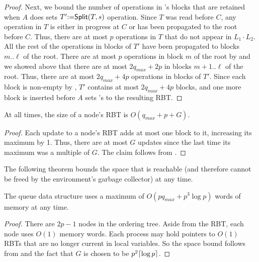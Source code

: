 \begin{proof}
Next, we bound the number of operations in 's blocks that are retained when $A$ does sets
$T'\mbox{:=}{\sf Split}(T,s)$ operation.
Since $T$ was read before $C$, any operation in $T$ is either in progress at $C$ or has been propagated to the root before $C$.
Thus, there are at most $p$ operations in $T$ that do not appear in $L_1\cdot L_2$.
All the rest of the operations in blocks of $T'$ have been propagated to blocks $m..\ell$ of the root.
There are at most $p$ operations in block $m$ of the root by 
and we showed above that there are at most $2q_{max} + 2p$ in blocks 
$m+1..\ell$ of the root.
Thus, there are at most $2q_{max}+4p$ operations in blocks of $T'$.
Since each block is non-empty by , $T'$ contains at most $2q_{max}+4p$ blocks, and one more 
block is inserted before $A$ sets 's  to the resulting RBT.
\end{proof}


\begin{corollary}\label{RBTbound}
At all times, the size of a node's RBT is $O(q_{max}+p+G)$. 
\end{corollary}
\begin{proof}
Each update to a node's RBT adds at most one block to it, increasing its maximum  by 1.
Thus, there are at most $G$ updates since the last time its maximum  was a multiple of $G$.
The claim follows from .
\end{proof}

The following theorem bounds the space that is reachable (and therefore cannot be freed by the environment's garbage collector) at any time.

\begin{mytheorem}\label{spaceBound}
The queue data structure uses a maximum of $O(pq_{max}+p^3\log p)$ words of memory at any time.
\end{mytheorem}
\begin{proof}
There are $2p-1$ nodes in the ordering tree.  Aside from the RBT, each node uses $O(1)$ memory words.
Each process may hold pointers to $O(1)$ RBTs that are no longer current in local variables.
So the space bound follows from  and the fact that $G$ is chosen
to be $p^2\lceil \log p \rceil$.
\end{proof}

